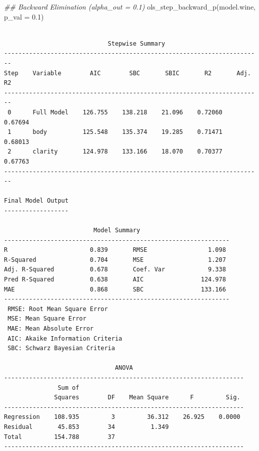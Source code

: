 \documentclass[
  letterpaper,
]{scrbook}
\newenvironment{Shaded}{\begin{snugshade}}{\end{snugshade}}
\newcommand{\AttributeTok}[1]{\textcolor[rgb]{0.40,0.45,0.13}{#1}}
\newcommand{\DocumentationTok}[1]{\textcolor[rgb]{0.37,0.37,0.37}{\textit{#1}}}
\newcommand{\FloatTok}[1]{\textcolor[rgb]{0.68,0.00,0.00}{#1}}
\newcommand{\FunctionTok}[1]{\textcolor[rgb]{0.28,0.35,0.67}{#1}}
\newcommand{\NormalTok}[1]{\textcolor[rgb]{0.00,0.23,0.31}{#1}}
\begin{document}
\begin{Shaded}
\begin{Highlighting}[]
\DocumentationTok{\#\# Backward Elimination (alpha\_out = 0.1)}
\FunctionTok{ols\_step\_backward\_p}\NormalTok{(model.wine, }\AttributeTok{p\_val =} \FloatTok{0.1}\NormalTok{)}
\end{Highlighting}
\end{Shaded}

\begin{verbatim}

                             Stepwise Summary                             
------------------------------------------------------------------------
Step    Variable        AIC        SBC       SBIC       R2       Adj. R2 
------------------------------------------------------------------------
 0      Full Model    126.755    138.218    21.096    0.72060    0.67694 
 1      body          125.548    135.374    19.285    0.71471    0.68013 
 2      clarity       124.978    133.166    18.070    0.70377    0.67763 
------------------------------------------------------------------------

Final Model Output 
------------------

                         Model Summary                          
---------------------------------------------------------------
R                       0.839       RMSE                 1.098 
R-Squared               0.704       MSE                  1.207 
Adj. R-Squared          0.678       Coef. Var            9.338 
Pred R-Squared          0.638       AIC                124.978 
MAE                     0.868       SBC                133.166 
---------------------------------------------------------------
 RMSE: Root Mean Square Error 
 MSE: Mean Square Error 
 MAE: Mean Absolute Error 
 AIC: Akaike Information Criteria 
 SBC: Schwarz Bayesian Criteria 

                               ANOVA                                
-------------------------------------------------------------------
               Sum of                                              
              Squares        DF    Mean Square      F         Sig. 
-------------------------------------------------------------------
Regression    108.935         3         36.312    26.925    0.0000 
Residual       45.853        34          1.349                     
Total         154.788        37                                    
-------------------------------------------------------------------


\end{verbatim}
\end{document}
